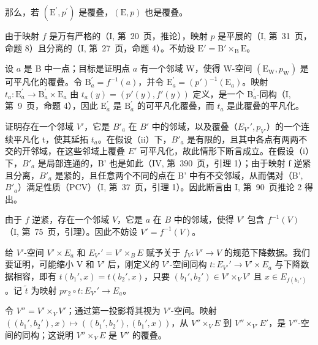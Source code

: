 那么，若 \((\mathrm{E}^{\prime}, p^{\prime})\) 是覆叠，\((\mathrm{E}, p)\) 也是覆叠。

由于映射 \(f\) 是万有严格的（I, 第~20~页，推论），映射 \(p\) 是平展的（I, 第~31~页，命题 8）且分离的（I, 第~27~页，命题 4）。不妨设 \(\mathrm{E}' = \mathrm{B}' \times_{\mathrm{B}} \mathrm{E}\)。

设 \(a\) 是 B 中一点；目标是证明点 \(a\) 有一个邻域 W，使得 W-空间 \((\mathrm{E_W}, p_{\mathrm{W}})\) 是可平凡化的覆叠。令 \(\mathrm{B}_a^\prime = f^{-1}(a)\)，并令 \(\mathrm{E}_a^\prime = (p')^{-1}(\mathrm{E}_a)\)。映射 \(t_a: \mathrm{E}_a^\prime \to \mathrm{B}_a^\prime \times \mathrm{E}_a\) 由 \(t_a(y) = (p'(y), f'(y))\) 定义，是一个 \(\mathrm{B}_a^\prime\)-同构（I, 第~9~页，命题 4），因此 \(\mathrm{E}_a^\prime\) 是 \(\mathrm{B}_a^\prime\) 的可平凡化覆叠，而 \(t_a\) 是此覆叠的平凡化。

证明存在一个邻域 \(V'\)，它是 \(B'_{a}\) 在 \(B'\) 中的邻域，以及覆叠（\(E_{V'}', p_{V'}\)）的一个连续平凡化 t，使其延拓 \(t_{a}\)。在假设（ii）下，\(B'_{a}\) 是有限的，且其中各点有两两不交的开邻域，在这些邻域上覆叠 \(E'\) 可平凡化，故此情形下断言成立。在假设（i）下，\(B'_{a}\) 是局部连通的，B' 也是如此（IV, 第~390~页，引理 1）；由于映射 f 逆紧且分离，\(B'_{a}\) 是紧的，且任意两个不同的点在 B' 中有不交邻域，从而偶对（B', \(B'_{a}\)）满足性质（PCV）（I, 第~37~页，引理 1）。因此断言由 I, 第~90~页推论 2 得出。

由于 \(f\) 逆紧，存在一个邻域 \(V\)，它是 \(a\) 在 \(B\) 中的邻域，使得 \(V'\) 包含 \(f^{-1}(V)\)（I, 第~75~页，引理）。因此不妨设 \(V' = f^{-1}(V)\)。

给 \(V'\)-空间 \(V' \times E_{a}\) 和 \(E_{V'}' = V' \times_{B} E\) 赋予关于 \(f_{V}: V' \to V\) 的规范下降数据。我们要证明，可能缩小 V 和 \(V'\) 后，刚定义的 \(V'\)-空间同构 \(t: E_{V'}' \to V' \times E_{a}\) 与下降数据相容，即有 \(t(b_{1}', x) = t(b_{2}', x)\)，只要 \((b_{1}', b_{2}') \in V' \times_{V} V'\) 且 \(x \in E_{f(b_{1}')}\)。记 \(\widetilde{t}\) 为映射 \(pr_{2} \circ t: E_{V'}' \to E_{a}\)。

令 \(V'' = V' \times_{V} V'\)；通过第一投影将其视为 \(V'\)-空间。映射 \(((b_{1}', b_{2}'), x) \mapsto ((b_{1}', b_{2}'), (b_{1}', x))\)，从 \(V'' \times_{V} E\) 到 \(V'' \times_{V'} E'\)，是 \(V''\)-空间的同构；这说明 \(V'' \times_{V} E\) 是 \(V''\) 的覆叠。

